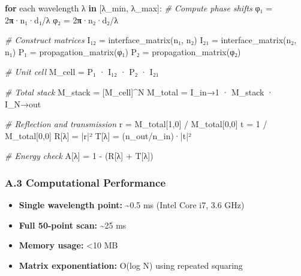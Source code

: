\documentclass[
]{article}
\newenvironment{Shaded}{}{}
\newcommand{\CommentTok}[1]{\textcolor[rgb]{0.38,0.63,0.69}{\textit{#1}}}
\newcommand{\ControlFlowTok}[1]{\textcolor[rgb]{0.00,0.44,0.13}{\textbf{#1}}}
\newcommand{\DecValTok}[1]{\textcolor[rgb]{0.25,0.63,0.44}{#1}}
\newcommand{\ErrorTok}[1]{\textcolor[rgb]{1.00,0.00,0.00}{\textbf{#1}}}
\newcommand{\KeywordTok}[1]{\textcolor[rgb]{0.00,0.44,0.13}{\textbf{#1}}}
\newcommand{\NormalTok}[1]{#1}
\newcommand{\OperatorTok}[1]{\textcolor[rgb]{0.40,0.40,0.40}{#1}}
\providecommand{\tightlist}{%
  \setlength{\itemsep}{0pt}\setlength{\parskip}{0pt}}
\begin{document}
\begin{Shaded}
\begin{Highlighting}[]
\ControlFlowTok{for}\NormalTok{ each wavelength λ }\KeywordTok{in}\NormalTok{ [λ\_min, λ\_max]:}
    \CommentTok{\# Compute phase shifts}
\NormalTok{    φ₁ }\OperatorTok{=} \DecValTok{2}\ErrorTok{π}\NormalTok{·n₁·d₁}\OperatorTok{/}\NormalTok{λ}
\NormalTok{    φ₂ }\OperatorTok{=} \DecValTok{2}\ErrorTok{π}\NormalTok{·n₂·d₂}\OperatorTok{/}\NormalTok{λ}
    
    \CommentTok{\# Construct matrices}
\NormalTok{    I₁₂ }\OperatorTok{=}\NormalTok{ interface\_matrix(n₁, n₂)}
\NormalTok{    I₂₁ }\OperatorTok{=}\NormalTok{ interface\_matrix(n₂, n₁)}
\NormalTok{    P₁ }\OperatorTok{=}\NormalTok{ propagation\_matrix(φ₁)}
\NormalTok{    P₂ }\OperatorTok{=}\NormalTok{ propagation\_matrix(φ₂)}
    
    \CommentTok{\# Unit cell}
\NormalTok{    M\_cell }\OperatorTok{=}\NormalTok{ P₁ · I₁₂ · P₂ · I₂₁}
    
    \CommentTok{\# Total stack}
\NormalTok{    M\_stack }\OperatorTok{=}\NormalTok{ [M\_cell]}\OperatorTok{\^{}}\NormalTok{N}
\NormalTok{    M\_total }\OperatorTok{=}\NormalTok{ I\_in→}\DecValTok{1}\NormalTok{ · M\_stack · I\_N→out}
    
    \CommentTok{\# Reflection and transmission}
\NormalTok{    r }\OperatorTok{=}\NormalTok{ M\_total[}\DecValTok{1}\NormalTok{,}\DecValTok{0}\NormalTok{] }\OperatorTok{/}\NormalTok{ M\_total[}\DecValTok{0}\NormalTok{,}\DecValTok{0}\NormalTok{]}
\NormalTok{    t }\OperatorTok{=} \DecValTok{1} \OperatorTok{/}\NormalTok{ M\_total[}\DecValTok{0}\NormalTok{,}\DecValTok{0}\NormalTok{]}
\NormalTok{    R[λ] }\OperatorTok{=} \OperatorTok{|}\NormalTok{r}\OperatorTok{|}\NormalTok{²}
\NormalTok{    T[λ] }\OperatorTok{=}\NormalTok{ (n\_out}\OperatorTok{/}\NormalTok{n\_in)·}\OperatorTok{|}\NormalTok{t}\OperatorTok{|}\NormalTok{²}
    
    \CommentTok{\# Energy check}
\NormalTok{    A[λ] }\OperatorTok{=} \DecValTok{1} \OperatorTok{{-}}\NormalTok{ (R[λ] }\OperatorTok{+}\NormalTok{ T[λ])}
\end{Highlighting}
\end{Shaded}

\subsubsection{A.3 Computational
Performance}\label{a.3-computational-performance}

\begin{itemize}
\tightlist
\item
  \textbf{Single wavelength point:} \textasciitilde0.5 ms (Intel Core
  i7, 3.6 GHz)
\item
  \textbf{Full 50-point scan:} \textasciitilde25 ms
\item
  \textbf{Memory usage:} \textless10 MB
\item
  \textbf{Matrix exponentiation:} O(log N) using repeated squaring
\end{itemize}
\end{document}
